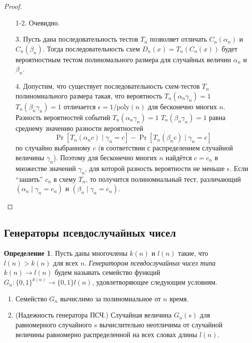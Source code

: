\documentclass[12pt]{article}
\newcommand{\bits}{\{0,1\}}
\newcommand{\poly}{\mathrm{poly}}
\theoremstyle{definition}
\newtheorem{definition}{Определение}[section]
\theoremstyle{plain}
\theoremstyle{remark}
\begin{document}
\begin{proof}\mbox{}
\begin{enumerate}
\item[1-2.] Очевидно.
\item[3.] Пусть дана последовательность тестов $T_n$
позволяет отличать $C_n(\alpha_n)$ и $C_n(\beta_n)$.
Тогда последовательность схем $D_n(x) = T_n(C_n(x))$
будет вероятностным тестом полиномального размера 
для случайных величин $\alpha_n$ и $\beta_n$.

\item[4.] Допустим, что существует последовательность 
схем-тестов $T_n$ полиномиального размера такая, что
вероятность $T_n(\alpha_n\gamma_n) = 1$
$T_n(\beta_n\gamma_n) = 1$ отличается $\epsilon = 1/\poly(n)$
для бесконечно многих $n$. Разность вероятностей
событий $T_n(\alpha_n\gamma_n) = 1$
$T_n(\beta_n\gamma_n) = 1$ равна среднему значению разности
вероятностей
$$
\Pr[T_n(\alpha_n c) \mid \gamma_n = c] - 
\Pr[T_n(\beta _n c) \mid \gamma_n = c]
$$
по случайно выбранному $c$ (в соответствии с распределением
случайной величины $\gamma_n$). Поэтому для бесконечно
многих $n$ найдётся $c=c_n$ в множестве значений $\gamma_n$,
для которой разность вероятности не меньше $\epsilon$.
Если ``зашить'' $c_n$ в схему $T_n$, то получится полиномиальный тест, различающий 
$(\alpha_n\mid\gamma_n = c_n)$ и 
$(\beta_n\mid\gamma_n = c_n)$.
\end{enumerate}
\end{proof}

\subsection{Генераторы псевдослучайных чисел}
\begin{definition}
Пусть даны многочлены $k(n)$ и $l(n)$ такие, что
$l(n) > k(n)$ для всех $n$. \emph{Генератором
псевдослучайных чисел типа $k(n)\to l(n)$} будем
называть семейство функций $G_n : \bits^{k(n)}\to \bits{l(n)}$, удовлетворяющее следующим условиям.
\begin{enumerate}
\item Семейство $G_n$ вычислимо за полиномиальное от $n$ время.
\item (Надежность генератора ПСЧ.) Случайная величина $G_n(s)$ для равномерного случайного $s$ вычислительно неотличима от случайной величины равномерно распределенной
на всех словах длины $l(n)$.
\end{enumerate}
\end{definition}
\end{document}
